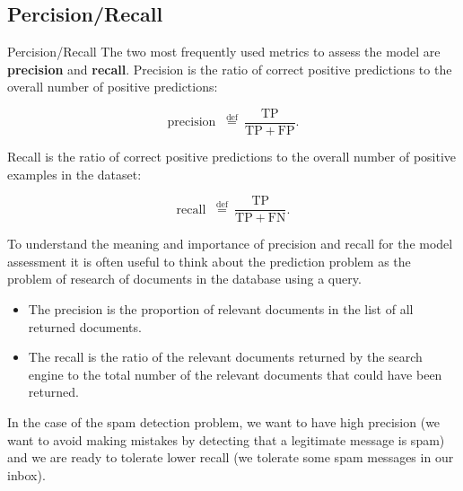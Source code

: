 \documentclass[8pt,dvipsnames]{beamer}
\begin{document}
\subsection{Percision/Recall}
\begin{frame}{Percision/Recall}
	The two most frequently used metrics to assess the model are \textbf{precision} and \textbf{recall}. Precision is the ratio of correct positive predictions to the overall number of positive predictions:

	$$
		\text { precision } \stackrel{\text { def }}{=} \frac{\mathrm{TP}}{\mathrm{TP}+\mathrm{FP}} \text {. }
	$$

	Recall is the ratio of correct positive predictions to the overall number of positive examples in the dataset:

	$$
		\text { recall } \stackrel{\text { def }}{=} \frac{\mathrm{TP}}{\mathrm{TP}+\mathrm{FN}} \text {. }
	$$
\end{frame}

\begin{frame}{}
	To understand the meaning and importance of precision and recall for the model assessment it is often useful to think about the prediction problem as the problem of research of documents in the database using a query.
	\begin{itemize}
		\item The precision is the proportion of relevant documents in the list of all returned documents.
		\item The recall is the ratio of the relevant documents returned by the search engine to the total number of the relevant documents that could have been returned.
	\end{itemize}
	In the case of the spam detection problem, we want to have high precision (we want to avoid making mistakes by detecting that a legitimate message is spam) and we are ready to tolerate lower recall (we tolerate some spam messages in our inbox).
\end{frame}
\end{document}

